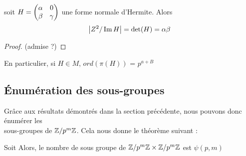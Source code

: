 \documentclass[12pt]{article}
\newcommand{\ZpmZ}{\Z/p^m\Z}
\newcommand{\ZZpm}{\ZpmZ \x \ZpmZ}
\begin{document}
\newpage
\begin{proposition}
	soit $H = \begin{pmatrix} \alpha & 0\\ \beta & \gamma \end{pmatrix}$ une forme normale d'Hermite. Alors
	$$\left\lvert Z^2/\operatorname{Im} H \right\rvert = \det(H) = \alpha\beta$$
\end{proposition}

\begin{proof}
	(admise ?)
\end{proof}

\begin{remark}
	En particulier, si $H \in M$, $ord(\pi(H))$ = $p^{a+B}$
\end{remark}
\subsection{Énumération des sous-groupes}
Grâce aux résultats démontrés dans la section précédente, nous pouvons donc énumérer les\\
sous-groupes de $\ZpmZ$. Cela nous donne le théorème suivant :
\begin{theorem}
	Soit
	Alors, le nombre de sous groupe de $\ZZpm$ est $\psi(p,m)$
\end{theorem}
\end{document}
